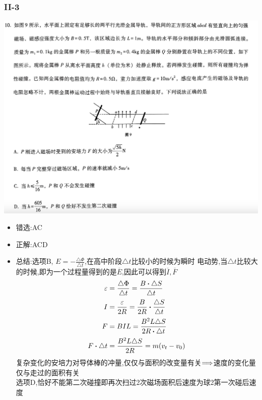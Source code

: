 \documentclass{article}
\begin{document}
    \subsubsection{II-3}
    \includegraphics[width=50em,keepaspectratio]{./pictures/1.3-3.png}

    \begin{itemize}
        \item 错选:\quad AC
        \item 正解:\quad ACD
        \item 总结:\quad 选项B, $E = - \frac{\triangle \Phi}{\triangle t}$,在高中阶段$\triangle t$比较小的时候为瞬时
        电动势,当$\triangle t$比较大的时候,即为一个过程量得到的是$\overline{E}$,因此可以得到$\overline{I},\overline{F}$
        \begin{align*}
            \varepsilon &= \frac{\triangle \Phi}{\triangle t} = \frac{B \vdot \triangle S}{\triangle t}   \\
            I &= \frac{\varepsilon}{2R} = \frac{B}{2R} \vdot \frac{\triangle S}{\triangle t} \\
            F &= B I L = \frac{B^{2}L \triangle S}{2R \vdot \triangle t}    \\
            F \vdot \triangle t &= \frac{B^{2} L \triangle S}{2 R} = m(v_{t} - v_{0})
        \end{align*}
        复杂变化的安培力对导体棒的冲量,仅仅与面积的改变量有关$\Longrightarrow$速度的变化量仅与走过的面积有关 \\
        选项D,恰好不能第二次碰撞即再次扫过2次磁场面积后速度为球2第一次碰后速度
    \end{itemize}
    
\end{document}
